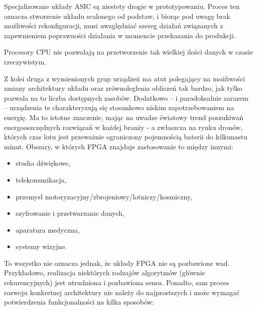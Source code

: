 Specjalizowane układy ASIC są niestety drogie w prototypowaniu. Proces ten oznacza stworzenie układu scalonego od podstaw, i biorąc pod uwagę brak możliwości rekonfiguracji, musi uwzględniać szereg działań związanych z zapewnieniem poprawności działania w momencie przekazania do produkcji.  %

Procesory CPU nie pozwalają na przetworzenie tak wielkiej ilości danych w czasie rzeczywistym. %

Z kolei druga z wymienionych grup urządzeń ma atut polegający na możliwości zmiany architektury układu oraz zrównoleglenia obliczeń tak bardzo, jak tylko pozwala na to liczba dostępnych zasobów. %
Dodatkowo -- i paradoksalnie zarazem -- urządzenia te charakteryzują się stosunkowo niskim zapotrzebowaniem na energię. 
Ma to istotne znaczenie, mając na uwadze światowy trend poszukiwań energooszczędnych rozwiązań w każdej branży -  a zwłaszcza na rynku dronów, których czas lotu jest przeważnie ograniczony pojemnością baterii do kilkunastu minut. %
Obszary, w których FPGA znajduje zastosowanie to między innymi:
\begin{itemize}
	\item studia dźwiękowe,
	\item telekomunikacja,
	\item przemysł motoryzacyjny/zbrojeniowy/lotniczy/kosmiczny,
	\item szyfrowanie i przetwarzanie danych,
	\item aparatura medyczna,
	\item systemy wizyjne.
\end{itemize}
To wszystko nie oznacza jednak, że układy FPGA nie są pozbawione wad. 
Przykładowo, realizacja niektórych rodzajów algorytmów (głównie rekurencyjnych) jest utrudniona i pozbawiona sensu. %
Ponadto, sam proces rozwoju konkretnej architektury nie należy do najprostszych i może wymagać potwierdzenia funkcjonalności na kilka sposobów:
